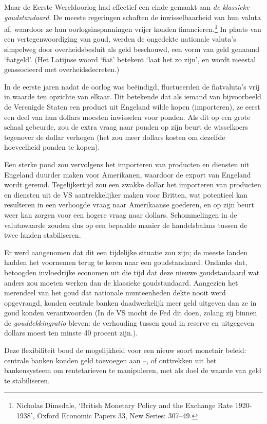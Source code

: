 \documentclass[
  a5paper,
  smalldemyvopaper,11pt,twoside,onecolumn,openright,extrafontsizes]{memoir}
\begin{document}
Maar de Eerste Wereldoorlog had effectief een einde gemaakt aan \emph{de
klassieke goudstandaard}. De meeste regeringen schaften de
inwisselbaarheid van hun valuta af, waardoor ze hun oorlogsinspanningen
vrijer konden financieren.\footnote{\hspace{0pt}Nicholas Dimsdale,
  `British Monetary Policy and the Exchange Rate 1920-1938', Oxford
  Economic Papers 33, New Series: 307--49.} In plaats van een
vertegenwoordiging van goud, werden de ongedekte nationale valuta's
simpelweg door overheidsbesluit als geld beschouwd, een vorm van geld
genaamd `fiatgeld'. (Het Latijnse woord `fiat' betekent `laat het zo
zijn', en wordt meestal geassocieerd met overheidsdecreten.)

In de eerste jaren nadat de oorlog was beëindigd, fluctueerden de
fiatvaluta's vrij in waarde ten opzichte van elkaar. Dit betekende dat
als iemand van bijvoorbeeld de Verenigde Staten een product uit Engeland
wilde kopen (importeren), ze eerst een deel van hun dollars moesten
inwisselen voor ponden. Als dit op een grote schaal gebeurde, zou de
extra vraag naar ponden op zijn beurt de wisselkoers tegenover de dollar
verhogen (het zou meer dollars kosten om dezelfde hoeveelheid ponden te
kopen).

Een sterke pond zou vervolgens het importeren van producten en diensten
uit Engeland duurder maken voor Amerikanen, waardoor de export van
Engeland wordt geremd. Tegelijkertijd zou een zwakke dollar het
importeren van producten en diensten uit de VS aantrekkelijker maken
voor Britten, wat potentieel kan resulteren in een verhoogde vraag naar
Amerikaanse goederen, en op zijn beurt weer kan zorgen voor een hogere
vraag naar dollars. Schommelingen in de valutawaarde zouden dus op een
bepaalde manier de handelsbalans tussen de twee landen stabiliseren.

Er werd aangenomen dat dit een tijdelijke situatie zou zijn; de meeste
landen hadden het voornemen terug te keren naar een goudstandaard.
Ondanks dat, betoogden invloedrijke economen uit die tijd dat deze
nieuwe goudstandaard wat anders zou moeten werken dan de klassieke
goudstandaard. Aangezien het merendeel van het goud dat nationale
munteenheden dekte nooit werd opgevraagd, konden centrale banken
daadwerkelijk meer geld uitgeven dan ze in goud konden verantwoorden (In
de VS mocht de Fed dit doen, zolang zij binnen de
\emph{gouddekkingratio} bleven: de verhouding tussen goud in reserve en
uitgegeven dollars moest ten minste 40 procent zijn.).

Deze flexibiliteit bood de mogelijkheid voor een nieuw soort monetair
beleid: centrale banken konden geld toevoegen aan --, of onttrekken uit
het bankensysteem om rentetarieven te manipuleren, met als doel de
waarde van geld te stabiliseren.
\end{document}
